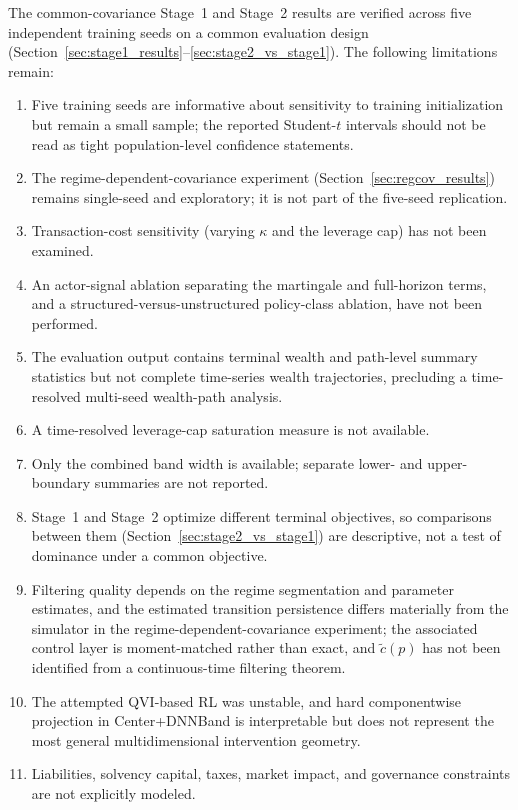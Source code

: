 \documentclass[a4paper,10pt]{article}
\begin{document}
The common-covariance Stage~1 and Stage~2 results are verified across five independent training seeds on a common evaluation design (Section~\ref{sec:stage1_results}--\ref{sec:stage2_vs_stage1}). The following limitations remain:
\begin{enumerate}[label=(\arabic*)]
\item Five training seeds are informative about sensitivity to training initialization but remain a small sample; the reported Student-$t$ intervals should not be read as tight population-level confidence statements.
\item The regime-dependent-covariance experiment (Section~\ref{sec:regcov_results}) remains single-seed and exploratory; it is not part of the five-seed replication.
\item Transaction-cost sensitivity (varying $\kappa$ and the leverage cap) has not been examined.
\item An actor-signal ablation separating the martingale and full-horizon terms, and a structured-versus-unstructured policy-class ablation, have not been performed.
\item The evaluation output contains terminal wealth and path-level summary statistics but not complete time-series wealth trajectories, precluding a time-resolved multi-seed wealth-path analysis.
\item A time-resolved leverage-cap saturation measure is not available.
\item Only the combined band width is available; separate lower- and upper-boundary summaries are not reported.
\item Stage~1 and Stage~2 optimize different terminal objectives, so comparisons between them (Section~\ref{sec:stage2_vs_stage1}) are descriptive, not a test of dominance under a common objective.
\item Filtering quality depends on the regime segmentation and parameter estimates, and the estimated transition persistence differs materially from the simulator in the regime-dependent-covariance experiment; the associated control layer is moment-matched rather than exact, and $\widetilde c(p)$ has not been identified from a continuous-time filtering theorem.
\item The attempted QVI-based RL was unstable, and hard componentwise projection in Center+DNNBand is interpretable but does not represent the most general multidimensional intervention geometry.
\item Liabilities, solvency capital, taxes, market impact, and governance constraints are not explicitly modeled.
\end{enumerate}
\end{document}
